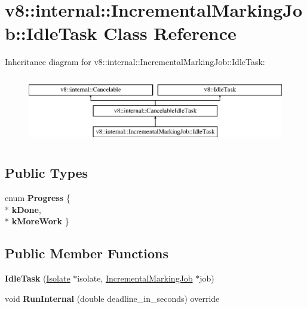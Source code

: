 \hypertarget{classv8_1_1internal_1_1_incremental_marking_job_1_1_idle_task}{}\section{v8\+:\+:internal\+:\+:Incremental\+Marking\+Job\+:\+:Idle\+Task Class Reference}
\label{classv8_1_1internal_1_1_incremental_marking_job_1_1_idle_task}
Inheritance diagram for v8\+:\+:internal\+:\+:Incremental\+Marking\+Job\+:\+:Idle\+Task\+:\begin{figure}[H]
\begin{center}
\leavevmode
\includegraphics[height=3.000000cm]{classv8_1_1internal_1_1_incremental_marking_job_1_1_idle_task}
\end{center}
\end{figure}
\subsection*{Public Types}
\begin{DoxyCompactItemize}
\item 
enum {\bfseries Progress} \{ \\*
{\bfseries k\+Done}, 
\\*
{\bfseries k\+More\+Work}
 \}\hypertarget{classv8_1_1internal_1_1_incremental_marking_job_1_1_idle_task_a1e77292964da1fd40381202f2330fcdf}{}\label{classv8_1_1internal_1_1_incremental_marking_job_1_1_idle_task_a1e77292964da1fd40381202f2330fcdf}

\end{DoxyCompactItemize}
\subsection*{Public Member Functions}
\begin{DoxyCompactItemize}
\item 
{\bfseries Idle\+Task} (\hyperlink{classv8_1_1internal_1_1_isolate}{Isolate} $\ast$isolate, \hyperlink{classv8_1_1internal_1_1_incremental_marking_job}{Incremental\+Marking\+Job} $\ast$job)\hypertarget{classv8_1_1internal_1_1_incremental_marking_job_1_1_idle_task_a730626a00c0bfe5557f0cf8ad9105a69}{}\label{classv8_1_1internal_1_1_incremental_marking_job_1_1_idle_task_a730626a00c0bfe5557f0cf8ad9105a69}

\item 
void {\bfseries Run\+Internal} (double deadline\+\_\+in\+\_\+seconds) override\hypertarget{classv8_1_1internal_1_1_incremental_marking_job_1_1_idle_task_a587b4b722c6782dcce303568ae88d4e7}{}\label{classv8_1_1internal_1_1_incremental_marking_job_1_1_idle_task_a587b4b722c6782dcce303568ae88d4e7}

\end{DoxyCompactItemize}
